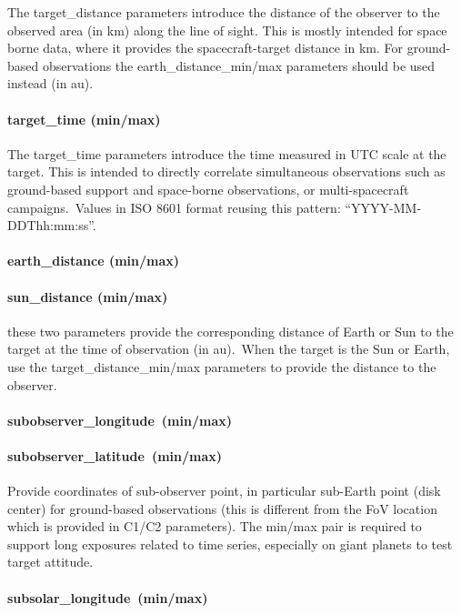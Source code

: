 \documentclass[11pt,a4paper]{ivoa}
\begin{document}
The target\_distance parameters introduce the distance of the observer to the observed area (in km) along the line of sight. This is mostly intended for space borne data, where it provides the spacecraft-target distance in km. For ground-based observations the earth\_distance\_min/max parameters should be used instead (in au).

\paragraph{target\_time (min/max)}

The target\_time parameters introduce the time measured in UTC scale at the target. This is intended to directly correlate simultaneous observations such as ground-based support and space-borne observations, or multi-spacecraft campaigns. Values in ISO 8601 format reusing this pattern: “YYYY-MM-DDThh:mm:ss”. 

\paragraph{earth\_distance (min/max)}

\paragraph{sun\_distance (min/max)}

these two parameters provide the corresponding distance of Earth or Sun to the target at the time of observation (in au). When the target is the Sun or Earth, use the target\_distance\_min/max parameters to provide the distance to the observer.

\paragraph{subobserver\_longitude (min/max)}

\paragraph{subobserver\_latitude (min/max)}

Provide coordinates of sub-observer point, in particular sub-Earth point (disk center) for ground-based observations (this is different from the FoV location which is provided in C1/C2 parameters). The min/max pair is required to support long exposures related to time series, especially on giant planets to test target attitude.

\paragraph{subsolar\_longitude (min/max)}
\end{document}

